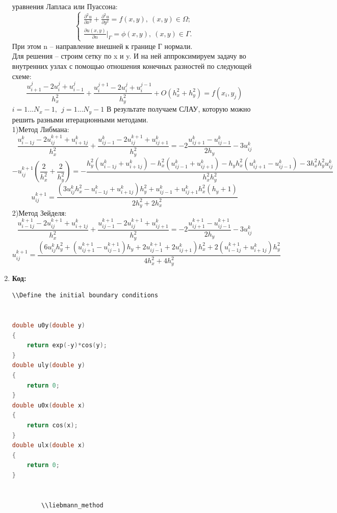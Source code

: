 \documentclass[12pt]{article}
\begin{document}
\begin{enumerate}
        уравнения Лапласа или Пуассона:
        $$\begin{cases}
            \frac{\partial^2u}{\partial x^2}+\frac{\partial^2u}{\partial y^2} = f(x,y),~(x,y)\in \Omega;\\
            \frac{\partial u(x,y)}{\partial n}\big|_\Gamma = \phi(x,y),~(x,y)\in \Gamma.
        \end{cases}$$
        При этом n – направление внешней к границе Г нормали.\\
        Для решения – строим сетку по x и y. И на ней аппроксимируем задачу во 
        внутренних узлах с помощью отношения конечных разностей по следующей 
        схеме:
        $$\frac{u_{i+1}^j-2u_{i}^j+u_{i-1}^j}{h_x^2}+\frac{u_i^{j+1}-2u_i^j+u_i^{j-1}}{h_y^2}+O(h_x^2+h_y^2) = f(x_i,y_j)$$
        $i = 1...N_x-1,~~j = 1...N_y-1$
        В результате получаем СЛАУ, которую можно решить разными итерационными методами.\\
        1)Метод Либмана:
        $$\frac{u^{k}_{i-1j}-2u^{k+1}_{ij}+u^{k}_{i+1j}}{h_x^2}+\frac{u^{k}_{ij-1}-2u^{k+1}_{ij}+u^{k}_{ij+1}}{h_y^2} = 
        -2\frac{u^{k}_{ij+1}-u^{k}_{ij-1}}{2h_y}-3u_{ij}^k$$
        $$-u^{k+1}_{ij}\left(\frac{2}{h_x^2}+\frac{2}{h_y^2}\right) = -\frac{h_y^2(u^{k}_{i-1j}+u^{k}_{i+1j})-h_x^2(u^{k}_{ij-1}+u^{k}_{ij+1})-
        h_yh_x^2(u^{k}_{ij+1}-u^{k}_{ij-1}) -3h_x^2h_y^2u_{ij}^k}{h_x^2h_y^2}$$
        $$u^{k+1}_{ij} = \frac{(3u_{ij}^kh_x^2 - u^{k}_{i-1j}+u^{k}_{i+1j})h_y^2 + u^{k}_{ij-1}+u^{k}_{ij+1}h_x^2(h_y + 1)}{2h_y^2 + 2h_x^2}$$
        2)Метод Зейделя:
        $$\frac{u^{k+1}_{i-1j}-2u^{k+1}_{ij}+u^{k}_{i+1j}}{h_x^2}+\frac{u^{k+1}_{ij-1}-2u^{k+1}_{ij}+u^{k}_{ij+1}}{h_y^2} = 
        -2\frac{u^{k+1}_{ij+1}-u^{k+1}_{ij-1}}{2h_y}-3u_{ij}^k$$
        $$u^{k+1}_{ij} = \frac{(6u_{ij}^kh_y^2 + (u^{k+1}_{ij+1} - u^{k+1}_{ij-1})h_y + 2u^{k+1}_{ij-1} + 2u^{k}_{ij+1})h_x^2 + 2(u^{k+1}_{i-1j} + 
        u^{k}_{i+1j})h_y^2}{4h_x^2 + 4h_y^2}$$
        
        \item \textbf{Код:}\\
        \begin{lstlisting}[language=C]
        \\Define the initial boundary conditions


double u0y(double y)
{
    return exp(-y)*cos(y);
}
double uly(double y)
{
    return 0;
}
double u0x(double x)
{
    return cos(x);
}
double ulx(double x)
{
    return 0;
}


        \\liebmann_method



\end{lstlisting}
\end{enumerate}
\end{document}
